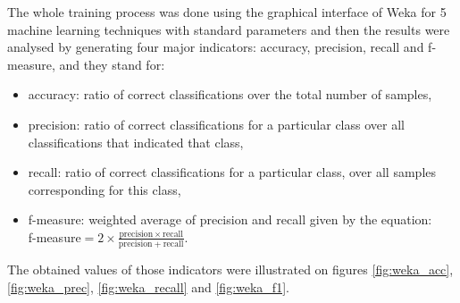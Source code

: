 The whole training process was done using the graphical interface of Weka for 5 machine learning techniques with standard parameters and then the results were analysed by generating four major indicators: accuracy, precision, recall and f-measure, and they stand for:
\begin{itemize}
    \item accuracy: ratio of correct classifications over the total number of samples,
    \item precision:  ratio of correct classifications for a particular class over all classifications that indicated that class,
    \item recall: ratio of correct classifications for a particular class, over all samples corresponding for this class,
    \item f-measure: weighted average of precision and recall given by the equation: \\f-measure\nolinebreak${= 2 \times \frac{\mathrm{precision} \times \mathrm{recall}}{\mathrm{precision} + \mathrm{recall}}}$.
\end{itemize}
The obtained values of those indicators were illustrated on figures \ref{fig:weka_acc}, \ref{fig:weka_prec}, \ref{fig:weka_recall} and \ref{fig:weka_f1}. 

